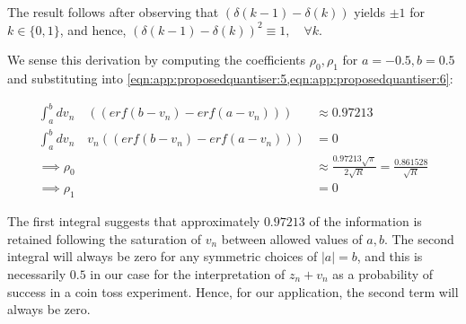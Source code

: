 The result follows after observing that $\left( \delta(k-1) - \delta(k) \right)$ yields $\pm 1 $ for $k \in \{ 0,1 \}$, and hence, $\left( \delta(k-1) - \delta(k) \right)^2 \equiv 1, \quad \forall k$. 

We sense this derivation by computing the coefficients $\rho_0, \rho_1$ for $a=-0.5, b = 0.5$ and substituting into \cref{eqn:app:proposedquantiser:5,eqn:app:proposedquantiser:6}:

\begin{align}
 \int_{a}^{b} dv_n \quad  \left( \left( erf(b - v_n) - erf(a - v_n)\right)  \right) & \approx 0.97213 \\
 \int_{a}^{b} dv_n \quad  v_n \left( \left( erf(b - v_n) - erf(a - v_n)\right)  \right) & = 0 \\
\implies \rho_0 & \approx \frac{0.97213 \sqrt{\pi}}{2\sqrt{R}} = \frac{0.861528}{\sqrt{R}} \label{eqn:app:applied_fisherinfo:1}\\
\implies \rho_1 &  = 0  \label{eqn:app:applied_fisherinfo:2}
\end{align}

The first integral suggests that approximately $ 0.97213 $ of the information is retained following the saturation of $v_n$ between allowed values of $a, b$. The second integral will always be zero for any symmetric choices of $|a|=b$, and this is necessarily $0.5$ in our case for the interpretation of $z_n + v_n$ as a probability of success in a coin toss experiment. Hence, for our application, the second term will always be zero. 

